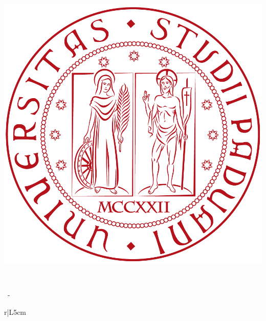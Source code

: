\documentclass[a4paper, oneside, openany,dvipsnames,table]{article}
\begin{document}


	\begin{titlepage}
		\begin{center}

			\begin{center}
				\centerline{\includegraphics[scale=0.20]{../template/img/logo.png}}
			\end{center}

			\vspace{1cm}

			\begin{Huge}
				\textbf{\Titolo{}} \\
			\end{Huge}

			\vspace{9pt}

			\begin{large}
				\textbf{\Gruppo{}}\ - \textbf{\NomeProgetto{}}\\%
				\vspace{6pt}
				\Mail{}
			\end{large}

			\vspace{15pt}

			\bgroup
			\def\arraystretch{1.3}
			\centering
			\begin{tabular}{r|L{5cm}}
				 \\ \hline


\end{tabular}
\end{center}
\end{titlepage}
\end{document}

